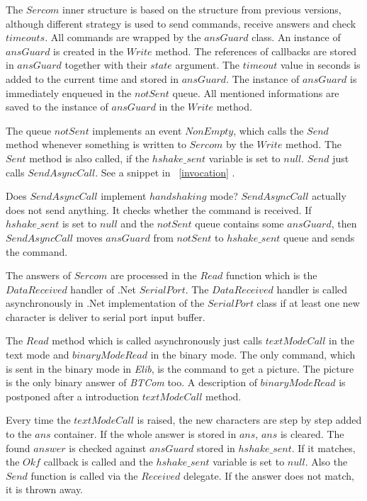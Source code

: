 \documentclass[12pt,notitlepage]{report}
\begin{document}
	The $Sercom$ inner structure is based on the structure from previous versions, although
	different strategy is used to send commands, receive answers and check $timeouts$.
	All commands are wrapped by the $ansGuard$ class. An instance of $ansGuard$ is created in the $Write$ method.
	The references of callbacks are stored in $ansGuard$ together with their $state$ argument.  
	The $timeout$ value in seconds is added to the current time and stored in $ansGuard$.
	The instance of $ansGuard$ is immediately enqueued in the $notSent$ queue.
	All mentioned informations are saved to the instance of $ansGuard$ in the $Write$ method.

	The queue $notSent$ implements an event $NonEmpty$, which calls the $Send$ method whenever something is written
	to $Sercom$ by the $Write$ method. The $Sent$ method is also called, if the $hshake\_sent$ variable is set to $null$.
	$Send$ just calls $SendAsyncCall$. See a snippet in ~\ref{invocation} .

	Does $SendAsyncCall$ implement $handshaking$ mode?
	$SendAsyncCall$ actually does not send anything. It checks whether the command is received. 
	If $hshake\_sent$ is set to $null$ and the $notSent$ queue
	contains some $ansGuard$, then $SendAsyncCall$ moves $ansGuard$ from $notSent$ to $hshake\_sent$
	queue and sends the command. 
	
	
	The answers of $Sercom$ are processed in the $Read$ function
	which is the $DataReceived$ handler of .Net $SerialPort$. The $DataReceived$ handler is called asynchronously
	in .Net implementation of the $SerialPort$ class if at least one new character is deliver to
	serial port input buffer. 

	The $Read$ method which is called asynchronously just calls $textModeCall$
	in the text mode and $binaryModeRead$ in the binary mode.
	The only command, which is sent in the binary mode in {\it Elib}, is the command to get a picture.
	The picture is the only binary answer of {\it BTCom} too.
	A description of $binaryModeRead$ is postponed after  
	a introduction $textModeCall$ method.
	
	Every time the $textModeCall$ is raised, the new characters are step by step
	added to the $ans$ container. If the whole answer is stored in $ans$, $ans$ is cleared.
	The found $answer$ is checked against $ansGuard$ stored in $hshake\_sent$.
	If it matches, the $Okf$ callback is called and the $hshake\_sent$ variable is set to $null$. 
	Also the $Send$ function is called via the $Received$ delegate. If the answer does not match, it is thrown away. 
	
\end{document}

